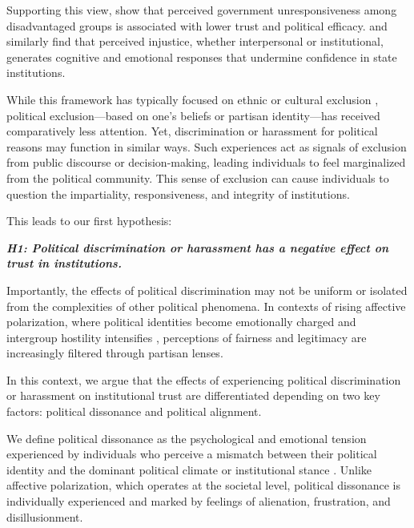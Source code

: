 \documentclass{article}
\begin{document}
Supporting this view, \textcite{levi_legitimating_2009} show that perceived government unresponsiveness among disadvantaged groups is associated with lower trust and political efficacy. \textcite{anderson_corruption_2003} and \textcite{oskooii_perceived_2020} similarly find that perceived injustice, whether interpersonal or institutional, generates cognitive and emotional responses that undermine confidence in state institutions.

While this framework has typically focused on ethnic or cultural exclusion \parencite{oskooii_perceived_2020, wilkes_immigration_2019, tyrberg_impact_2024}, political exclusion—based on one's beliefs or partisan identity—has received comparatively less attention. Yet, discrimination or harassment for political reasons may function in similar ways. Such experiences act as signals of exclusion from public discourse or decision-making, leading individuals to feel marginalized from the political community. This sense of exclusion can cause individuals to question the impartiality, responsiveness, and integrity of institutions.

This leads to our first hypothesis:

\emph{\textbf{\small
H1: Political discrimination or harassment has a negative effect on trust in institutions.
}}

Importantly, the effects of political discrimination may not be uniform or isolated from the complexities of other political phenomena. In contexts of rising affective polarization, where political identities become emotionally charged and intergroup hostility intensifies \parencite{iyengar_origins_2019, mccoy_polarization_2018}, perceptions of fairness and legitimacy are increasingly filtered through partisan lenses.

In this context, we argue that the effects of experiencing political discrimination or harassment on institutional trust are differentiated depending on two key factors: political dissonance and political alignment. 

We define political dissonance as the psychological and emotional tension experienced by individuals who perceive a mismatch between their political identity and the dominant political climate or institutional stance \parencite{lelkes_limits_2017, federico_ideological_2012}. Unlike affective polarization, which operates at the societal level, political dissonance is individually experienced and marked by feelings of alienation, frustration, and disillusionment.
\end{document}
